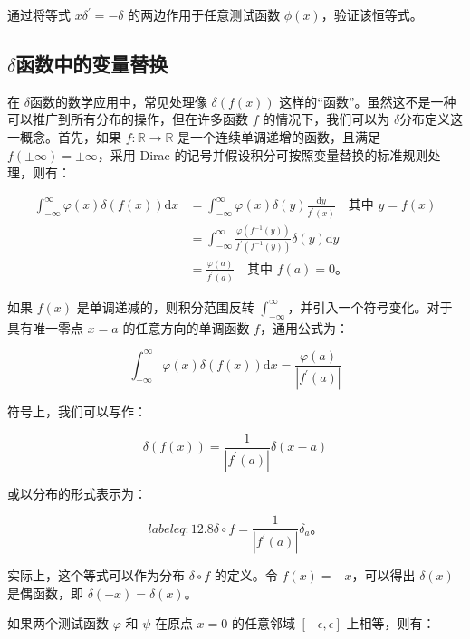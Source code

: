 \begin{exercise}
  通过将等式 $x \delta^{\prime} = -\delta$
  的两边作用于任意测试函数 $\phi(x)$，验证该恒等式。
\end{exercise}

\subsection{$\delta$函数中的变量替换}
在 $\delta$函数的数学应用中，常见处理像 $\delta(f(x))$
这样的``函数''。虽然这不是一种可以推广到所有分布的操作，但在许多函数
$f$ 的情况下，我们可以为 $\delta$分布定义这一概念。首先，如果
$f: \mathbb{R} \to \mathbb{R}$ 是一个连续单调递增的函数，且满足
$f(\pm \infty) = \pm \infty$，采用 Dirac
的记号并假设积分可按照变量替换的标准规则处理，则有：

$$
\begin{aligned}
\int_{-\infty}^\infty \varphi(x) \delta(f(x)) \mathrm{d}x & = \int_{-\infty}^\infty \varphi(x) \delta(y) \frac{\mathrm{d}y}{f^{\prime}(x)} \quad \text{其中 } y = f(x) \\
& = \int_{-\infty}^\infty \frac{\varphi\left(f^{-1}(y)\right)}{f^{\prime}\left(f^{-1}(y)\right)} \delta(y) \mathrm{d}y \\
& = \frac{\varphi(a)}{f^{\prime}(a)} \quad \text{其中 } f(a) = 0。
\end{aligned}
$$

如果 $f(x)$ 是单调递减的，则积分范围反转
$\int_{-\infty}^\infty$，并引入一个符号变化。对于具有唯一零点
$x = a$ 的任意方向的单调函数 $f$，通用公式为：

\begin{equation} \label{eq:12.7}
 \int_{-\infty}^\infty \varphi(x) \delta(f(x)) \mathrm{d}x = \frac{\varphi(a)}{\left|f^{\prime}(a)\right|} 
 \end{equation}

符号上，我们可以写作：

$$
\delta(f(x)) = \frac{1}{\left|f^{\prime}(a)\right|} \delta(x - a)
$$

或以分布的形式表示为：

\begin{equation} label{eq:12.8}
 \delta \circ f = \frac{1}{\left|f^{\prime}(a)\right|} \delta_a。 
 \end{equation}

实际上，这个等式可以作为分布 $\delta \circ f$ 的定义。令
$f(x) = -x$，可以得出 $\delta(x)$ 是偶函数，即
$\delta(-x) = \delta(x)$。

如果两个测试函数 $\varphi$ 和 $\psi$ 在原点 $x=0$ 的任意邻域
$[-\epsilon, \epsilon]$ 上相等，则有：

